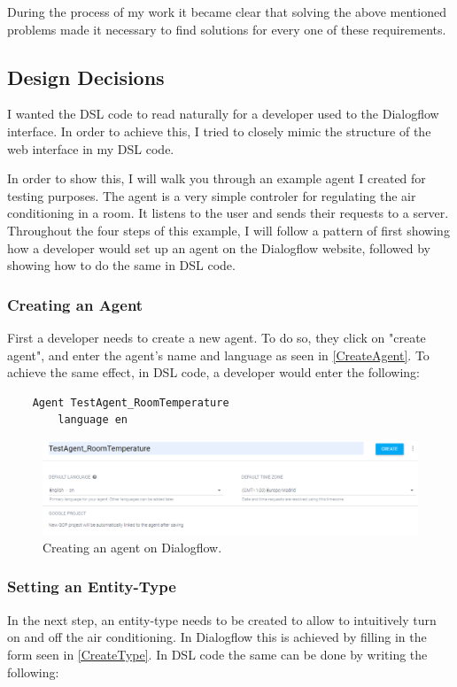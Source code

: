 During the process of my work it became clear that solving the above mentioned problems made it necessary to find solutions for every one of these requirements.

\subsection{Design Decisions}

I wanted the DSL code to read naturally for a developer used to the Dialogflow interface.
In order to achieve this, I tried to closely mimic the structure of the web interface in my DSL code.

In order to show this, I will walk you through an example agent I created for testing purposes. The agent is a very simple controler for regulating the air conditioning in a room. It listens to the user and sends their requests to a server. Throughout the four steps of this example, I will follow a pattern of first showing how a developer would set up an agent on the Dialogflow website, followed by showing how to do the same in DSL code.

\subsubsection{Creating an Agent}
First a developer needs to create a new agent. To do so, they click on "create agent", and enter the agent's name and language as seen in \autoref{CreateAgent}.
To achieve the same effect, in DSL code, a developer would enter the following:

\begin{verbatim}
    Agent TestAgent_RoomTemperature
        language en 
\end{verbatim}

\begin{figure}[ht]
    \centering
    \includegraphics[width=1\textwidth]{Thesis Images/CreateAgent.PNG}
    \caption{Creating an agent on Dialogflow.}
        \label{CreateAgent}
\end{figure}

\subsubsection{Setting an Entity-Type}
In the next step, an entity-type needs to be created to allow to intuitively turn on and off the air conditioning.
In Dialogflow this is achieved by filling in the form seen in \autoref{CreateType}.
In DSL code the same can be done by writing the following:

